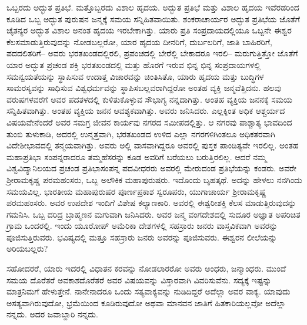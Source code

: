 ಒಬ್ಬರದು ಅದ್ಭುತ ಪ್ರತಿಭೆ. ಮತ್ತೊಬ್ಬರದು ವಿಶಾಲ ಹೃದಯ. ಅದ್ಭುತ ಪ್ರತಿಭೆ ಮತ್ತು ವಿಶಾಲ ಹೃದಯ ಇವೆರಡರಿಂದ ಕೂಡಿದ ಒಬ್ಬ ಅದ್ಭುತ ಪುರುಷನ ಜನ್ಮಕ್ಕೆ ಸಮಯ ಸನ್ನಿಹಿತವಾಯಿತು. ಶಂಕರಾಚಾರ್ಯರ ಅದ್ಭುತ ಪ್ರತಿಭೆಯ ಜೊತೆಗೆ ಚೈತನ್ಯರ ಅದ್ಭುತ ವಿಶಾಲ ಅನಂತ ಹೃದಯ ಇರಬೇಕಾಗಿತ್ತು. ಯಾರು ಪ್ರತಿ ಸಂಪ್ರದಾಯದಲ್ಲಿಯೂ ಒಬ್ಬನೇ ಈಶ್ವರ ಕೆಲಸಮಾಡುತ್ತಿರುವುದನ್ನು ನೋಡಬಲ್ಲರೋ, ಯಾರ ಹೃದಯ ದೀನರಿಗೆ, ದುರ್ಬಲರಿಗೆ, ಜಾತಿ ಬಾಹಿರ\-ರಿಗೆ, ಪದದಲಿತರಿಗೆ– ಅವರು ಭರತಖಂಡದಲ್ಲಿರಲಿ, ಪ್ರಪಂಚದಲ್ಲಿ ಬೇರೆಲ್ಲಿ ಬೇಕಾದರೂ ಇರಲಿ– ಮರುಗುತ್ತಿತ್ತೋ ಜೊತೆಗೆ ಯಾರ ಅದ್ಭುತ ಪ್ರಚಂಡ ಶಕ್ತಿ ಭರತಖಂಡದಲ್ಲಿ ಮತ್ತು ಹೊರಗೆ ಇರುವ ಭಿನ್ನ ಭಿನ್ನ ಸಂಪ್ರದಾಯಗಳಲ್ಲಿ ಸಮನ್ವಯತೆಯನ್ನು ಸ್ಥಾಪಿಸುವ ಉದಾತ್ತ ವಿಚಾರವನ್ನು ಚಿಂತಿಸಿತೊ, ಯಾರು ಹೃದಯ ಮತ್ತು ಬುದ್ಧಿಗಳ ಸಾಮರಸ್ಯವನ್ನು ಸಾಧಿಸುವ ವಿಶ್ವಧರ್ಮವನ್ನು ಸ್ಥಾಪಿಸಬಲ್ಲವರಾಗಿದ್ದರೋ ಅಂತಹ ವ್ಯಕ್ತಿ ಜನ್ಮವೆತ್ತಿದನು. ಹಲವು ವರುಷಗಳವರೆಗೆ ಅವರ ಪದತಳದಲ್ಲಿ ಕುಳಿತುಕೊಳ್ಳುವ ಸೌಭಾಗ್ಯ ನನ್ನದಾಗಿತ್ತು. ಅಂತಹ ವ್ಯಕ್ತಿಯ ಜನನಕ್ಕೆ ಸಮಯ ಸನ್ನಿಹಿತವಾಗಿತ್ತು. ಅಂತಹ ವ್ಯಕ್ತಿಯ ಜನನ ಆವಶ್ಯಕವಾಗಿತ್ತು. ಅವರು ಜನಿಸಿದರು. ಎಲ್ಲಕ್ಕಿಂತ ಅಧಿಕ ಆಶ್ಚರ್ಯದ ವಿಷಯವೇನೆಂದರೆ ಅವರ ಸಮಗ್ರ ಜೀವನ ಕಾರ್ಯವು ನಗರದ ಸಮೀಪದಲ್ಲಿತ್ತು. ಆ ನಗರವು ಪಾಶ್ಚಾತ್ಯ ಭಾವದಿಂದ ತುಂಬಿ ತುಳುಕಾಡಿ, ಅದರಲ್ಲಿ ಉನ್ಮತ್ತವಾಗಿ, ಭರತಖಂಡದ ಉಳಿದ ಎಲ್ಲಾ ನಗರಗಳಿಗಿಂತಲೂ ಅಧಿಕತರವಾಗಿ ವಿದೇಶೀ\break ಭಾವದಲ್ಲಿ ತನ್ಮಯವಾಗಿತ್ತು. ಅವರು ಅಲ್ಲಿ ವಾಸವಾಗಿದ್ದರೂ ಅವರಲ್ಲಿ ಪುಸ್ತಕ ಪಾಂಡಿತ್ಯವೇ ಇರಲಿಲ್ಲ. ಅಂತಹ ಮಹಾಪ್ರತಿಭಾ ಸಂಪನ್ನರಾದರೂ ತಮ್ಮ\break ಹೆಸರನ್ನು ಕೂಡ ಅವರಿಗೆ ಬರೆಯಲು ಬರುತ್ತಿರಲಿಲ್ಲ. ಆದರೆ ನಮ್ಮ ವಿಶ್ವವಿದ್ಯಾನಿಲಯದ ಪ್ರಚಂಡ ಪ್ರತಿಭಾಸಂಪನ್ನ ಪದವೀಧರರು ಅವರಲ್ಲಿ ಮೇರುದಂಡ ಪ್ರತಿಭೆಯನ್ನು ಕಂಡರು. ಅವರೇ ಶ‍್ರೀರಾಮಕೃಷ್ಣ ಪರಮಹಂಸರು, ಒಬ್ಬ ಅಲೌಕಿಕ ಮಹಾಪುರುಷರು. ಇದೊಂದು ಬೃಹತ್ಕಥೆ. ಅದನ್ನು ಹೇಳಲು ನನಗಿಂದು ಸಮಯವಿಲ್ಲ. ಭಾರತೀಯ ಮಹಾಪುರುಷರ ಪೂರ್ಣಪ್ರಕಾಶ ಸ್ವರೂಪರು, ಯುಗಾಚಾರ್ಯ ಶ‍್ರೀರಾಮಕೃಷ್ಣ ಪರಮಹಂಸರು. ಅವರ ಉಪದೇಶ ಇಂದಿಗೆ ವಿಶೇಷ ಕಲ್ಯಾಣಕಾರಿ. ಅವರಲ್ಲಿ ಈಶ್ವರೀಶಕ್ತಿ ಕೆಲಸ ಮಾಡುತ್ತಿರುವುದನ್ನು ಗಮನಿಸಿ. ಒಬ್ಬ ದರಿದ್ರ ಬ್ರಾಹ್ಮಣನ ಮಗುವಾಗಿ ಜನಿಸಿದರು. ಅವರ ಜನ್ಮ ವಂಗದೇಶದಲ್ಲಿ ಸುದೂರ ಅಜ್ಞಾತ ಅಪರಿಚಿತ ಗ್ರಾಮ ಒಂದರಲ್ಲಿ. ಇಂದು ಯೂರೋಪ್​ ಅಮೆರಿಕಾ ದೇಶಗಳಲ್ಲಿ ಸಹಸ್ರಾರು ಜನರು ವಾಸ್ತವಿಕವಾಗಿ ಅವರನ್ನು ಪೂಜಿಸುತ್ತಿರುವರು. ಭವಿಷ್ಯದಲ್ಲಿ ಮತ್ತೂ ಸಹಸ್ರಾರು ಜನರು ಅವರನ್ನು ಪೂಜಿಸುವರು. ಈಶ್ವರನ ಲೀಲೆಯನ್ನು ಅರಿಯಬಲ್ಲರು?

ಸಹೋದರರೆ, ಯಾರು ಇದರಲ್ಲಿ ವಿಧಾತನ ಕರವನ್ನು ನೋಡಲಾರರೋ ಅವರು ಅಂಧರು, ಜನ್ಮಾಂಧರು. ಮುಂದೆ ಸಮಯ ದೊರೆತರೆ ಅವಕಾಶ\break ದೊರೆತರೆ ಅವರ ವಿಷಯವನ್ನು ವಿಸ್ತಾರವಾಗಿ ವಿವರಿಸುವೆನು. ಸದ್ಯಕ್ಕೆ ಇಷ್ಟನ್ನು ಮಾತ್ರನಿಮಗೆ ಹೇಳುತ್ತೇನೆ. ನಾನೇನಾದರೂ ಒಂದು ಸತ್ಯವಾಕ್ಯವನ್ನು ನುಡಿದಿದ್ದರೆ ಅದೆಲ್ಲಾ ಅವರ ವಾಕ್ಯ. ಯಾವುದು ಅಸತ್ಯವಾಗಿರುವುದೋ, ಭ್ರಮೆಯಿಂದ ಕೂಡಿರುವುದೋ ಅಥವಾ ಮಾನವನ ಜಾತಿಗೆ ಹಿತಕಾರಿಯಲ್ಲವೋ ಅದೆಲ್ಲಾ ನನ್ನದು. ಅದರ ಜವಾಬ್ದಾರಿ ನನ್ನದು.

